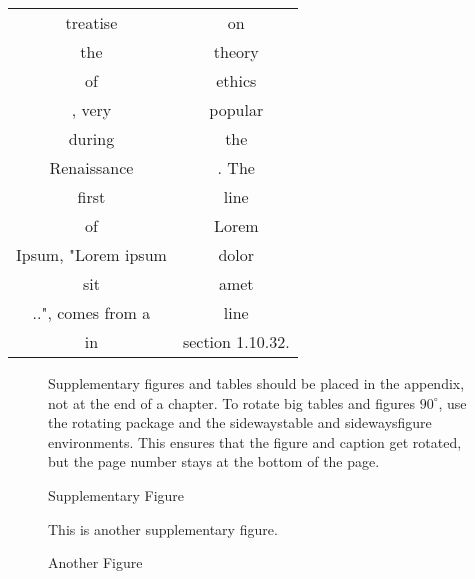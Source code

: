 \begin{appendices}
\begin{longtable}{cc}
\\ treatise & on \\ the & theory \\ of & ethics \\, very & popular \\ during
&the \\ Renaissance &. The \\ first & line \\ of & Lorem \\ Ipsum, "Lorem ipsum
& dolor \\ sit & amet \\..", comes from a & line \\ in & section
1.10.32.\\
\end{longtable}


\begin{sidewaysfigure}
  \centering Supplementary figures and tables should be placed in the appendix,
  not at the end of a chapter. To rotate big tables and figures $90^{\circ}$,
  use the rotating package and the sidewaystable and sidewaysfigure
  environments. This ensures that the figure and caption get rotated, but the
  page number stays at the bottom of the page.
  \caption{Supplementary Figure}
  \label{fig:figuresup1}
\end{sidewaysfigure}

\begin{figure}[ht]
  \centering
  This is another supplementary figure.
  \caption{Another Figure}
  \label{fig:figuresup3}
\end{figure}


\end{appendices}
